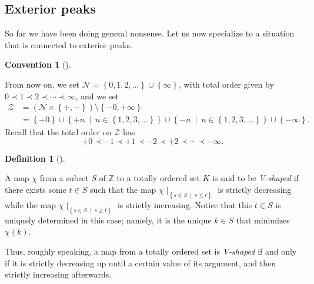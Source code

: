 \documentclass[numbers=enddot,12pt,final,onecolumn,notitlepage]{scrartcl}%
\theoremstyle{definition}
\newtheorem{defi}[theo]{Definition}
\newenvironment{definition}[1][]
{\begin{defi}[#1]\begin{leftbar}}
{\end{leftbar}\end{defi}}
\newtheorem{conv}[theo]{Convention}
\newenvironment{convention}[1][]
{\begin{conv}[#1]\begin{leftbar}}
{\end{leftbar}\end{conv}}
\newenvironment{convention}[1][Convention]{\noindent\textbf{#1.} }{\ \rule{0.5em}{0.5em}}
\begin{document}
\subsection{Exterior peaks}

So far we have been doing general nonsense. Let us now specialize to a
situation that is connected to exterior peaks.

\begin{convention}
From now on, we set $\mathcal{N}=\left\{  0,1,2,\ldots\right\}  \cup\left\{
\infty\right\}  $, with total order given by $0\prec1\prec2\prec\cdots
\prec\infty$, and we set
\begin{align*}
\mathcal{Z}  &  =\left(  \mathcal{N}\times\left\{  +,-\right\}  \right)
\setminus\left\{  -0,+\infty\right\} \\
&  =\left\{  +0\right\}  \cup\left\{  +n\ \mid\ n\in\left\{  1,2,3,\ldots
\right\}  \right\}  \cup\left\{  -n\ \mid\ n\in\left\{  1,2,3,\ldots\right\}
\right\}  \cup\left\{  -\infty\right\}  .
\end{align*}
Recall that the total order on $\mathcal{Z}$ has%
\[
+0\prec-1\prec+1\prec-2\prec+2\prec\cdots\prec-\infty.
\]

\end{convention}

\begin{definition}
A map $\chi$ from a subset $S$ of $\mathbb{Z}$ to a totally ordered set $K$ is
said to be \textit{V-shaped} if there exists some $t\in S$ such that the map
$\chi\mid_{\left\{  s\in S\ \mid\ s\leq t\right\}  }$ is strictly decreasing
while the map $\chi\mid_{\left\{  s\in S\ \mid\ s\geq t\right\}  }$ is
strictly increasing. Notice that this $t\in S$ is uniquely determined in this
case; namely, it is the unique $k\in S$ that minimizes $\chi\left(  k\right)
$.
\end{definition}

Thus, roughly speaking, a map from a totally ordered set is \textit{V-shaped}
if and only if it is strictly decreasing up until a certain value of its
argument, and then strictly increasing afterwards.
\end{document}

